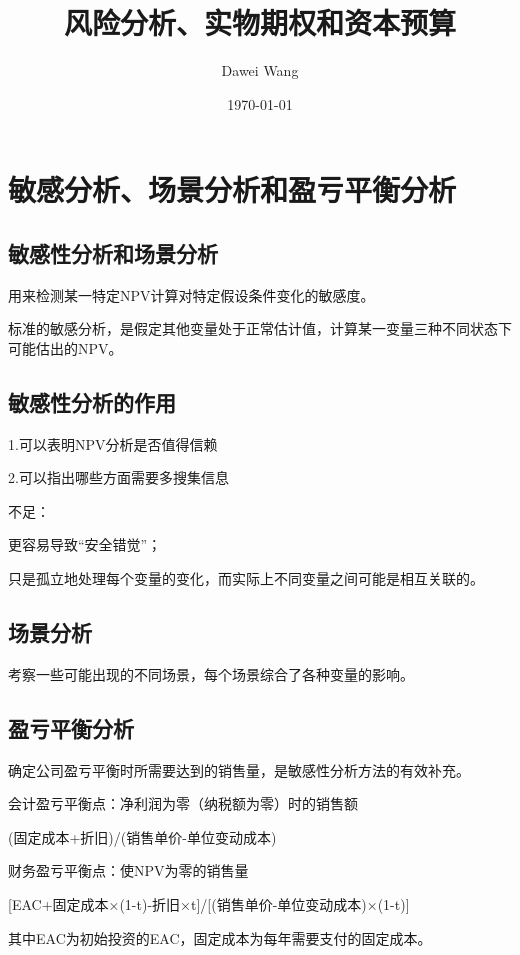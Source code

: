\documentclass{article}
\title{风险分析、实物期权和资本预算}
\author{Dawei Wang}
\date{\today}
\begin{document}
	\maketitle
\section{敏感分析、场景分析和盈亏平衡分析}
\subsection{敏感性分析和场景分析}
用来检测某一特定NPV计算对特定假设条件变化的敏感度。

标准的敏感分析，是假定其他变量处于正常估计值，计算某一变量三种不同状态下可能估出的NPV。

\subsection{敏感性分析的作用}

1.可以表明NPV分析是否值得信赖

2.可以指出哪些方面需要多搜集信息

\hspace*{\fill}

不足：

更容易导致“安全错觉”；

只是孤立地处理每个变量的变化，而实际上不同变量之间可能是相互关联的。

\subsection{场景分析}

考察一些可能出现的不同场景，每个场景综合了各种变量的影响。

\subsection{盈亏平衡分析}
确定公司盈亏平衡时所需要达到的销售量，是敏感性分析方法的有效补充。

会计盈亏平衡点：净利润为零（纳税额为零）时的销售额

(固定成本+折旧)/(销售单价-单位变动成本)

\hspace*{\fill}

财务盈亏平衡点：使NPV为零的销售量

[EAC+固定成本×(1-t)-折旧×t]/[(销售单价-单位变动成本)×(1-t)]
 
其中EAC为初始投资的EAC，固定成本为每年需要支付的固定成本。
 
\end{document}
